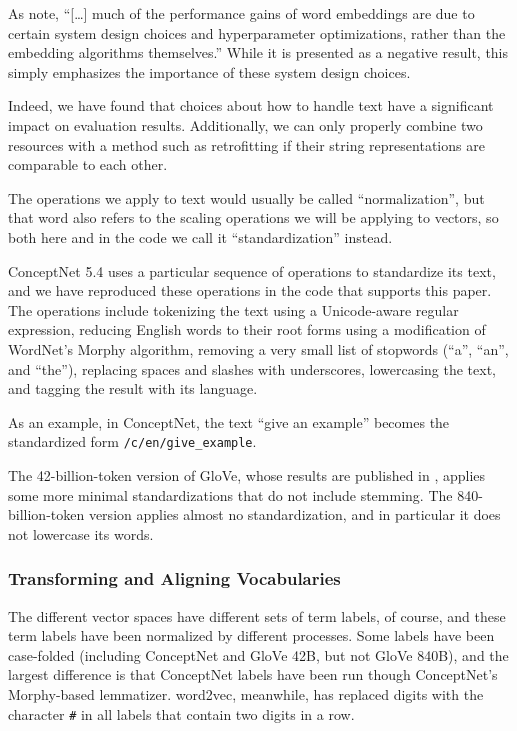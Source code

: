 \documentclass[11pt,letterpaper]{article}
\begin{document}
As  note,
``[\ldots] much of the performance gains of word embeddings are due to certain
system design choices and hyperparameter optimizations, rather than the
embedding algorithms themselves.'' While it is presented as a negative result,
this simply emphasizes the importance of these system design choices.

Indeed, we have found that choices about how to handle text have a significant
impact on evaluation results. Additionally, we can only properly combine two
resources with a method such as retrofitting if their string representations
are comparable to each other.

The operations we apply to text would usually be called ``normalization'',
but that word also refers to the scaling operations we will be applying to
vectors, so both here and in the code we call it ``standardization'' instead.

ConceptNet 5.4 uses a particular sequence of operations to standardize its
text, and we have reproduced these operations in the code that supports this
paper.  The operations include tokenizing the text using a Unicode-aware
regular expression, reducing English words to their root forms using a
modification of WordNet's Morphy algorithm, removing a very small list of
stopwords (``a'', ``an'', and ``the''), replacing spaces and slashes with
underscores, lowercasing the text, and tagging the result with its language.

As an example, in ConceptNet, the text ``give an example'' becomes the standardized form
{\tt /c/en/give\_example}.

The 42-billion-token version of GloVe, whose results are published in
\cite{pennington2014glove}, applies some more minimal standardizations that do
not include stemming. The 840-billion-token version applies almost no
standardization, and in particular it does not lowercase its words.

\subsubsection{Transforming and Aligning Vocabularies}

The different vector spaces have different sets of term labels, of course, and
these term labels have been normalized by different processes. Some labels
have been case-folded (including ConceptNet and GloVe 42B, but not GloVe 840B),
and the largest difference is that ConceptNet labels have been run though
ConceptNet's Morphy-based lemmatizer. word2vec, meanwhile, has replaced digits
with the character {\tt #} in all labels that contain two digits in a row.
\end{document}
